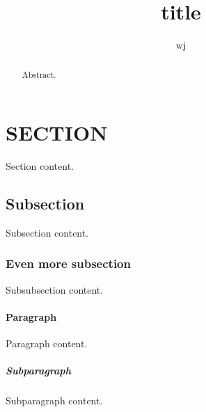 \documentclass[12pt]{article}
\begin{document}
\title{title}
\author{wj}
\date{}
\maketitle

\renewcommand{\abstractname}{abstract}
\begin{abstract}
Abstract.
\end{abstract}



\section{SECTION}	%
Section content.

\subsection{Subsection}
Subsection content.

\subsubsection{Even more subsection}
Subsubsection content.

\paragraph{Paragraph}
Paragraph content.

\subparagraph{Subparagraph}
Subparagraph content.
\end{document}

